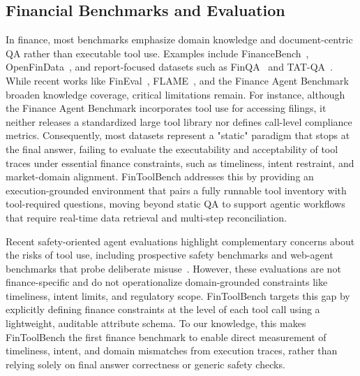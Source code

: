 \documentclass[sigconf,nonacm]{acmart}
\newcommand{\bench}{FinToolBench}
\begin{document}
\subsection{Financial Benchmarks and Evaluation}
In finance, most benchmarks emphasize domain knowledge and document-centric QA rather than executable tool use. Examples include FinanceBench~\cite{islam2023financebench}, OpenFinData~\cite{openfindata2023github}, and report-focused datasets such as FinQA~\cite{chen2021finqa} and TAT-QA~\cite{zhu2021tat}. While recent works like FinEval~\cite{guo2025fineval}, FLAME~\cite{guo2025flame}, and the Finance Agent Benchmark~\cite{bigeard2025finance} broaden knowledge coverage, critical limitations remain. For instance, although the Finance Agent Benchmark incorporates tool use for accessing filings, it neither releases a standardized large tool library nor defines call-level compliance metrics. Consequently, most datasets represent a "static" paradigm that stops at the final answer, failing to evaluate the executability and acceptability of tool traces under essential finance constraints, such as timeliness, intent restraint, and market-domain alignment. \bench{} addresses this by providing an execution-grounded environment that pairs a fully runnable tool inventory with tool-required questions, moving beyond static QA to support agentic workflows that require real-time data retrieval and multi-step reconciliation.

Recent safety-oriented agent evaluations highlight complementary concerns about the risks of tool use, including prospective safety benchmarks and web-agent benchmarks that probe deliberate misuse~\cite{xia2025safetoolbench,tur2025safearena}. However, these evaluations are not finance-specific and do not operationalize domain-grounded constraints like timeliness, intent limits, and regulatory scope. \bench{} targets this gap by explicitly defining finance constraints at the level of each tool call using a lightweight, auditable attribute schema. To our knowledge, this makes \bench{} the first finance benchmark to enable direct measurement of timeliness, intent, and domain mismatches from execution traces, rather than relying solely on final answer correctness or generic safety checks.
\end{document}
